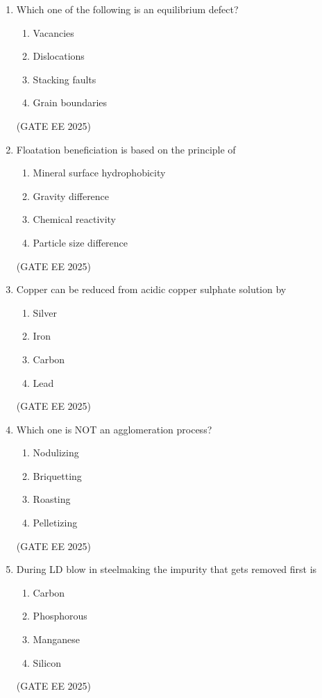 \documentclass[11pt, letterpaper]{article}
\theoremstyle{remark}
\begin{document}
\begin{enumerate}
\item Which one of the following is an equilibrium defect?
\begin{multicols}{4}
\begin{enumerate}  
\item Vacancies
\item Dislocations
\item Stacking faults
\item Grain boundaries
\end{enumerate}
\end{multicols}
\hfill(GATE EE 2025)

\item Floatation beneficiation is based on the principle of  
\begin{multicols}{2}
\begin{enumerate}  
\item Mineral surface hydrophobicity
\item Gravity difference
\item Chemical reactivity
\item Particle size difference
\end{enumerate}
\end{multicols}
\hfill(GATE EE 2025)
 

\item Copper can be reduced from acidic copper sulphate solution by  
\begin{multicols}{4}
\begin{enumerate}  
\item Silver
\item Iron
\item Carbon
\item Lead
\end{enumerate}
\end{multicols}
\hfill(GATE EE 2025)
 

\item Which one is NOT an agglomeration process?  
\begin{multicols}{4}
\begin{enumerate}  
\item Nodulizing
\item Briquetting
\item Roasting
\item Pelletizing
\end{enumerate}
\end{multicols}
\hfill(GATE EE 2025)
 

\item During LD blow in steelmaking the impurity that gets removed first is  
\begin{multicols}{4}
\begin{enumerate}  
\item Carbon
\item Phosphorous
\item Manganese
\item Silicon
\end{enumerate}
\end{multicols}
\hfill(GATE EE 2025)
 


\end{enumerate}
\end{document}
